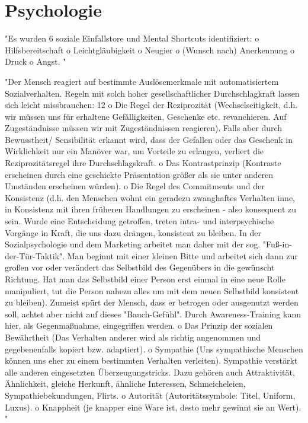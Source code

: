 \chapter{Psychologie}
\label{chapter:psychologie}

"Es wurden 6 soziale Einfallstore und Mental Shortcuts identifiziert:
o Hilfsbereitschaft
o Leichtgläubigkeit
o Neugier
o (Wunsch nach) Anerkennung
o Druck
o Angst.
"\cite{10_bka}

"Der Mensch reagiert auf bestimmte Auslösemerkmale mit automatisiertem Sozialverhalten. Regeln mit solch hoher gesellschaftlicher Durchschlagkraft lassen sich leicht
missbrauchen:
12
o Die Regel der Reziprozität (Wechselseitigkeit, d.h. wir müssen uns für erhaltene Gefälligkeiten, Geschenke etc. revanchieren. Auf Zugeständnisse müssen wir mit Zugeständnissen reagieren). Falls aber durch Bewusstheit/ Sensibilität erkannt wird, dass der Gefallen oder das Geschenk in Wirklichkeit nur
ein Manöver war, um Vorteile zu erlangen, verliert die Reziprozitätsregel ihre
Durchschlagskraft.
o Das Kontrastprinzip (Kontraste erscheinen durch eine geschickte Präsentation
größer als sie unter anderen Umständen erscheinen würden).
o Die Regel des Commitments und der Konsistenz (d.h. den Menschen wohnt
ein geradezu zwanghaftes Verhalten inne, in Konsistenz mit ihren früheren
Handlungen zu erscheinen - also konsequent zu sein. Wurde eine Entscheidung getroffen, treten intra- und interpsychische Vorgänge in Kraft, die uns
dazu drängen, konsistent zu bleiben. In der Sozialpsychologie und dem Marketing arbeitet man daher mit der sog. "Fuß-in-der-Tür-Taktik". Man beginnt
mit einer kleinen Bitte und arbeitet sich dann zur großen vor oder verändert
das Selbstbild des Gegenübers in die gewünscht Richtung. Hat man das
Selbstbild einer Person erst einmal in eine neue Rolle manipuliert, tut die Person nahezu alles um mit dem neuen Selbstbild konsistent zu bleiben). Zumeist spürt der Mensch, dass er betrogen oder ausgenutzt werden soll, achtet
aber nicht auf dieses "Bauch-Gefühl". Durch Awareness-Training kann hier,
als Gegenmaßnahme, eingegriffen werden.
o Das Prinzip der sozialen Bewährtheit (Das Verhalten anderer wird als richtig
angenommen und gegebenenfalls kopiert bzw. adaptiert).
o Sympathie (Uns sympathische Menschen können uns eher zu einem bestimmten Verhalten verleiten). Sympathie verstärkt alle anderen eingesetzten
Überzeugungstricks. Dazu gehören auch Attraktivität, Ähnlichkeit, gleiche
Herkunft, ähnliche Interessen, Schmeicheleien, Sympathiebekundungen, Flirts.
o Autorität (Autoritätssymbole: Titel, Uniform, Luxus).
o Knappheit (je knapper eine Ware ist, desto mehr gewinnt sie an Wert). "\cite{10_bka}


